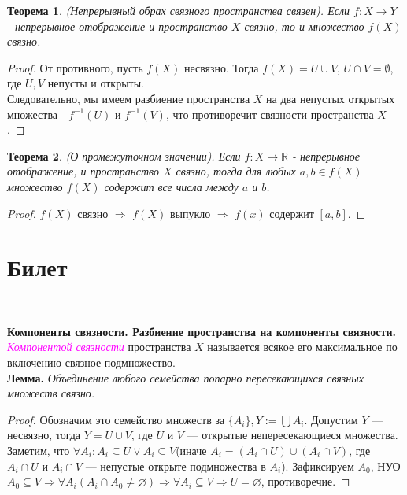 \documentclass[a4paper,100pt]{article}
\theoremstyle{indented}
\newtheorem{theorem}{Теорема}
\begin{document}
\begin{theorem}
    (Непрерывный обрах связного пространства связен). Если $f: X\rightarrow Y$ - непрерывное отображение и пространство $X$ связно, то и множество $f(X)$ связно.
\end{theorem}

\begin{proof}
    От противного, пусть $f(X)$ несвязно. Тогда $f(X)=U\cup V$, $U\cap V = \emptyset$, где $U, V$ непусты и открыты.\\

    Следовательно, мы имеем разбиение пространства $X$ на два непустых открытых множества - $f^{-1}(U)$ и $f^{-1}(V)$, что противоречит связности пространства $X$.
\end{proof}

\begin{theorem}
    (О промежуточном значении). Если $f: X\rightarrow \mathbb{R}$ - непрерывное отображение, и пространство $X$ связно, тогда для любых $a, b\in f(X)$ множество $f(X)$ содержит все числа между $a$ и $b$.
\end{theorem}

\begin{proof}
    $f(X)$ связно $\Rightarrow$ $f(X)$ выпукло $\Rightarrow$ $f(x)$ содержит $[a,b]$.
\end{proof}

\section{Билет} \

\medskip

\textbf{Компоненты связности. Разбиение пространства на компоненты связности.}\\
    
    \textit{\textcolor{magenta}{Компонентой связности}} пространства $X$ называется всякое его максимальное по включению связное подмножество.\\
    
    \textbf{Лемма.} \textit{Объединение любого семейства попарно пересекающихся связных множеств связно.}
    
    \begin{proof}
        Обозначим это семейство множеств за $\{A_i\}, Y:=\bigcup A_i$. Допустим $Y$ --- несвязно, тогда $Y = U \cup V$, где $U$ и $V$ --- открытые непересекающиеся множества. Заметим, что $\forall A_i: A_i \subseteq U \vee A_i \subseteq V$(иначе $A_i = (A_i\cap U)\cup(A_i \cap V)$, где $A_i \cap U$ и $A_i \cap V$ --- непустые открыте подмножества в $A_i$). Зафиксируем $A_0$, НУО $A_0 \subseteq V \Rightarrow \forall A_i (A_i \cap A_0 \neq \varnothing) \Rightarrow \forall A_i \subseteq V \Rightarrow U = \varnothing$, противоречие.
    \end{proof}
    
\end{document}
